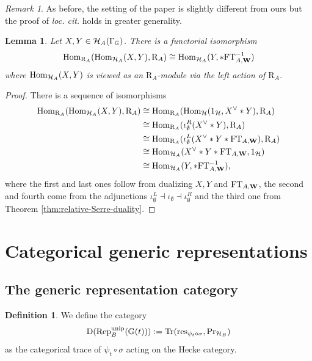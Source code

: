 \documentclass[a4paper, 10pt, oneside, reqno]{amsart}
\theoremstyle{plain}
\newtheorem{lem}[thm]{Lemma}
\theoremstyle{definition}
\newtheorem{defi}[thm]{Definition}
\theoremstyle{remark}
\newtheorem{rque}[thm]{Remark}
\newcommand{\Gbb}{\mathbb{G}}
\newcommand{\RR}{\mathrm{R}}
\newcommand{\Prr}{\mathrm{Pr}}
\newcommand{\restr}{\mathrm{res}}
\newcommand{\FT}{\mathrm{FT}}
\begin{document}
\begin{rque}
As before, the setting of the paper \cite{SandvikRelativeSerreDuality} is slightly different from ours but the proof of \emph{loc. cit.} holds in greater generality. 
\end{rque}

\begin{lem}\label{lem:serre-duality-hecke-category}
Let $X,Y \in \Hcal_A(\Gamma_{\Gbb})$. There is a functorial isomorphism 
$$\Hom_{\RR_A}(\Hom_{\Hcal_A}(X,Y), \RR_A) \cong \Hom_{\Hcal_A}(Y, * \FT_{A,\Wbf}^{-1})$$
where $\mathrm{Hom}_{\mathcal{H}_A}(X,Y)$ is viewed as an $\RR_A$-module via the left action of $\RR_A$.
\end{lem}

\begin{proof}
There is a sequence of isomorphisms 
\begin{align*}
\Hom_{\RR_A}(\Hom_{\Hcal_A}(X,Y), \RR_A) &\cong \Hom_{\RR_A}(\Hom_{\Hcal}(1_{\Hcal}, X^{\vee} * Y), \RR_A) \\
&\cong \Hom_{\RR_A}(\iota_{\emptyset}^R(X^{\vee} * Y), \RR_A) \\
&\cong \Hom_{\RR_A}(\iota_{\emptyset}^L(X^{\vee} * Y * \FT_{A, \Wbf}), \RR_A) \\
&\cong \Hom_{\Hcal_A}(X^{\vee} * Y * \FT_{A, \Wbf}, 1_{\Hcal}) \\
&\cong \Hom_{\Hcal_A}(Y, * \FT_{A,\Wbf}^{-1}),
\end{align*}
where the first and last ones follow from dualizing $X,Y$ and $\FT_{A,\Wbf}$, the second and fourth come from the adjunctions $\iota_{\emptyset}^{L} \dashv \iota_{\emptyset} \dashv \iota_{\emptyset}^R$ and the third one from Theorem \ref{thm:relative-Serre-duality}.
\end{proof}

\section{Categorical generic representations}

\subsection{The generic representation category}\label{sec:generic-representation}

\begin{defi}\label{defi:generic-representation-category}
We define the category 
$$\DD(\Rep_{B}^{\unip}(\Gbb(t))) := \Tr(\restr_{\psi_t \circ \sigma}, \Prr_{\Hcal_B})$$
as the categorical trace of $\psi_t \circ \sigma$ acting on the Hecke category.
\end{defi}
\end{document}
